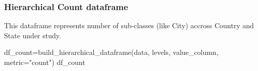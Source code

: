 \documentclass[
  letterpaper,
  DIV=11,
  numbers=noendperiod]{scrartcl}
\newenvironment{Shaded}{\begin{snugshade}}{\end{snugshade}}
\newcommand{\NormalTok}[1]{\textcolor[rgb]{0.00,0.23,0.31}{#1}}
\newcommand{\OperatorTok}[1]{\textcolor[rgb]{0.37,0.37,0.37}{#1}}
\newcommand{\StringTok}[1]{\textcolor[rgb]{0.13,0.47,0.30}{#1}}
\begin{document}
\hypertarget{hierarchical-count-dataframe}{%
\subsubsection{Hierarchical Count
dataframe}\label{hierarchical-count-dataframe}}

This dataframe represents number of sub-classes (like City) accross
Country and State under study.

\begin{Shaded}
\begin{Highlighting}[]
\NormalTok{df\_count}\OperatorTok{=}\NormalTok{build\_hierarchical\_dataframe(data, levels, value\_column, metric}\OperatorTok{=}\StringTok{"count"}\NormalTok{)}
\NormalTok{df\_count}
\end{Highlighting}
\end{Shaded}
\end{document}
